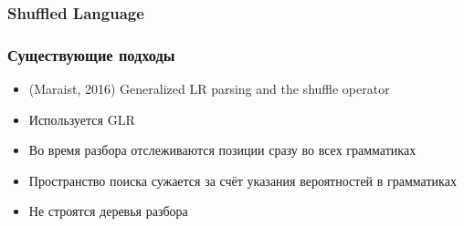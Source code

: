\documentclass{beamer}
\begin{document}
\begin{frame}
     \frametitle{Shuffled Language}
     
 \end{frame}
 
 \begin{frame}
     \frametitle{Существующие подходы}
         \begin{itemize}
             \item (Maraist, 2016) Generalized LR parsing and the shuffle operator 
             \item Используется GLR
             \item Во время разбора отслеживаются позиции сразу во всех грамматиках
             \item Пространство поиска сужается за счёт указания вероятностей в грамматиках
             \item Не строятся деревья разбора
         \end{itemize}
 \end{frame}
 
\end{document}
